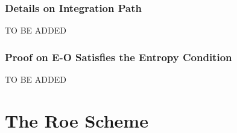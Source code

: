 \documentclass[a4paper]{article}
\begin{document}
\subsubsection{Details on Integration Path}
TO BE ADDED
\subsubsection{Proof on E-O Satisfies the Entropy Condition}
TO BE ADDED

\section{The Roe Scheme}
\end{document}
